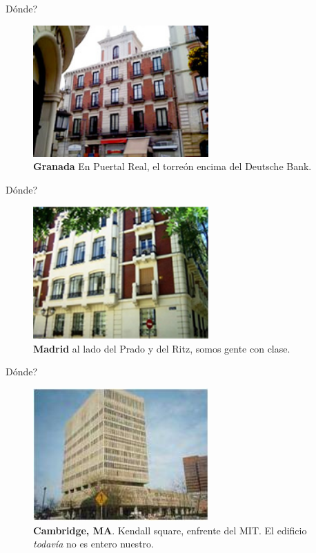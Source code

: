 \documentclass[12pt,compress]{beamer}
\begin{document}
\begin{frame}{Dónde?}

\begin{figure}[htbp]
\centering
\includegraphics[width=0.60000\textwidth]{images/granada.jpg}
\caption{\textbf{Granada} En Puertal Real, el torreón encima del
Deutsche Bank.}
\end{figure}

\end{frame}

\begin{frame}{Dónde?}

\begin{figure}[htbp]
\centering
\includegraphics[width=0.60000\textwidth]{images/madrid.png}
\caption{\textbf{Madrid} al lado del Prado y del Ritz, somos gente con
clase.}
\end{figure}

\end{frame}

\begin{frame}{Dónde?}

\begin{figure}[htbp]
\centering
\includegraphics[width=0.60000\textwidth]{images/boston.jpg}
\caption{\textbf{Cambridge, MA}. Kendall square, enfrente del MIT. El
edificio \emph{todavía} no es entero nuestro.}
\end{figure}

\end{frame}
\end{document}
